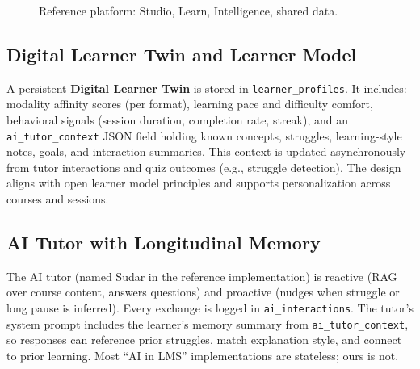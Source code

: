 \documentclass[10pt,twocolumn]{article}
\begin{document}
\begin{figure}[t]
\centering
{}
\caption{Reference platform: Studio, Learn, Intelligence, shared data.}
\label{fig:arch}
\end{figure}

\subsection{Digital Learner Twin and Learner Model}
\label{sec:twin}

A persistent \textbf{Digital Learner Twin} is stored in \texttt{learner\_profiles}. It includes: modality affinity scores (per format), learning pace and difficulty comfort, behavioral signals (session duration, completion rate, streak), and an \texttt{ai\_tutor\_context} JSON field holding known concepts, struggles, learning-style notes, goals, and interaction summaries. This context is updated asynchronously from tutor interactions and quiz outcomes (e.g., struggle detection). The design aligns with open learner model principles \cite{bull2016} and supports personalization across courses and sessions.

\subsection{AI Tutor with Longitudinal Memory}
\label{sec:tutor}

The AI tutor (named Sudar in the reference implementation) is reactive (RAG over course content, answers questions) and proactive (nudges when struggle or long pause is inferred). Every exchange is logged in \texttt{ai\_interactions}. The tutor's system prompt includes the learner's memory summary from \texttt{ai\_tutor\_context}, so responses can reference prior struggles, match explanation style, and connect to prior learning. Most ``AI in LMS'' implementations are stateless; ours is not.
\end{document}
